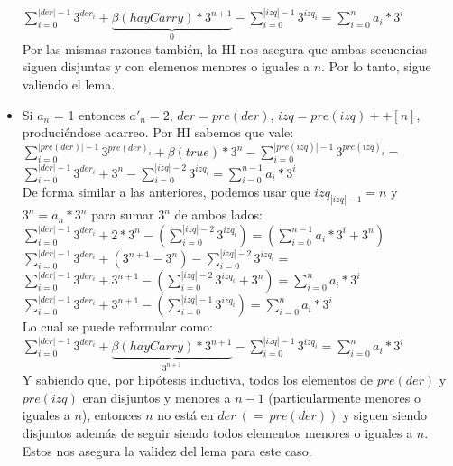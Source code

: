 \begin{itemize}
	$\sum_{i=0}^{|der|-1} 3^{der_i} + \underbrace{\beta(hayCarry)*3^{n+1}}_\text{0} - \sum_{i=0}^{|izq|-1} 3^{izq_i} = \sum_{i=0}^{n} a_i*3^{i} $
	\\

	Por las mismas razones también, la HI nos asegura que ambas secuencias siguen disjuntas y con elemenos menores o iguales a $n$. Por lo tanto, sigue valiendo el lema.

	\item Si $a_n$ = 1 entonces $a'_n = 2$, $der = pre(der)$, $izq = pre(izq)++[n]$, produciéndose acarreo. Por HI sabemos que vale: \\

	$\sum_{i=0}^{|pre(der)|-1} 3^{pre(der)_i} + \beta(true)*3^{n} - \sum_{i=0}^{|pre(izq)|-1} 3^{pre(izq)_i} =$
	\\

	$\sum_{i=0}^{|der|-1} 3^{der_i} + 3^{n} - \sum_{i=0}^{|izq|-2} 3^{izq_i} = \sum_{i=0}^{n-1} a_i*3^{i} $
	\\

	De forma similar a las anteriores, podemos usar que $izq_{|izq|-1} = n$ y $ 3^{n} = a_{n}*3^{n}$ para sumar $3^{n}$ de ambos lados:
	\\

	$\sum_{i=0}^{|der|-1} 3^{der_i} + 2*3^{n} - (\sum_{i=0}^{|izq|-2} 3^{izq_i}) = (\sum_{i=0}^{n-1} a_i*3^{i} + 3^{n}) $
	\\

	$\sum_{i=0}^{|der|-1} 3^{der_i} + (3^{n+1}-3^{n}) - \sum_{i=0}^{|izq|-2} 3^{izq_i} = $
	\\

	$\sum_{i=0}^{|der|-1} 3^{der_i} + 3^{n+1} - (\sum_{i=0}^{|izq|-2} 3^{izq_i} + 3^{n}) = \sum_{i=0}^{n} a_i*3^{i} $	\\

	$\sum_{i=0}^{|der|-1} 3^{der_i} + 3^{n+1} - (\sum_{i=0}^{|izq|-1} 3^{izq_i}) = \sum_{i=0}^{n} a_i*3^{i} $
	\\

	Lo cual se puede reformular como: \\

	$\sum_{i=0}^{|der|-1} 3^{der_i} + \underbrace{\beta(hayCarry)*3^{n+1}}_\text{$3^{n+1}$} - \sum_{i=0}^{|izq|-1} 3^{izq_i} = \sum_{i=0}^{n} a_i*3^{i} $
	\\

	Y sabiendo que, por hipótesis inductiva, todos los elementos de $pre(der)$ y $pre(izq)$ eran disjuntos y menores a $n-1$ (particularmente menores o iguales a $n$), entonces $n$ no está en $der\ (=\ pre(der))$ y siguen siendo disjuntos además de seguir siendo todos elementos menores o iguales a $n$. Estos nos asegura la validez del lema para este caso.


\end{itemize}
